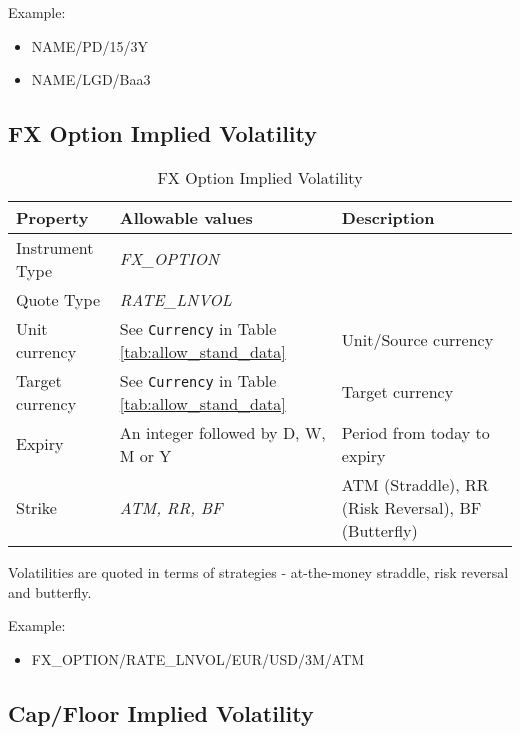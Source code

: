 Example:
\begin{itemize}
\item {NAME/PD/15/3Y}
\item{NAME/LGD/Baa3}
\end{itemize}

\subsection{FX Option Implied Volatility}

\begin{table}[H]
\centering
\begin{tabular}{|p{3cm}|p{3.5cm}|p{7cm}|}
\hline
{\bf Property} & {\bf Allowable values} & {\bf Description} \\
\hline
  Instrument Type & \emph{FX\_OPTION} & \\ \hline
  Quote Type & \emph{RATE\_LNVOL} & \\ \hline
  Unit currency & See \lstinline!Currency! in Table \ref{tab:allow_stand_data}& Unit/Source currency\\ \hline
  Target currency & See \lstinline!Currency! in Table \ref{tab:allow_stand_data} & Target currency\\ \hline
  Expiry & An integer followed by D, W, M or Y & Period from today to expiry \\ \hline
  Strike & \emph{ATM, RR, BF} & ATM (Straddle), RR (Risk Reversal), BF (Butterfly) \\
\hline
\end{tabular}
  \caption{FX Option Implied Volatility}
  \label{tab:fximplvol_quote}
\end{table}

Volatilities are quoted in terms of strategies - at-the-money straddle, risk reversal and butterfly.

\medskip
Example:
\begin{itemize}
\item {FX\_OPTION/RATE\_LNVOL/EUR/USD/3M/ATM}
\end{itemize}

\subsection{Cap/Floor Implied Volatility}\label{ss:capfloor_impl_vol_quote}

